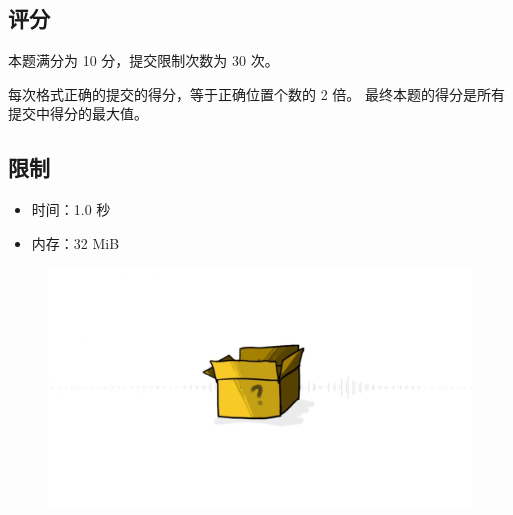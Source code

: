 \documentclass[UTF8, 11pt, a4paper]{article}
\begin{document}
\subsection*{评分}
本题满分为 10 分，提交限制次数为 30 次。

每次格式正确的提交的得分，等于正确位置个数的 2 倍。%
最终本题的得分是所有提交中得分的最大值。

\subsection*{限制}
\begin{itemize}
\item 时间：1.0 秒
\item 内存：32 MiB
\end{itemize}

\begin{figure}[h]\centering
\includegraphics[width=0.6 \textwidth]{betsunohako.png}
\end{figure}
\end{document}
